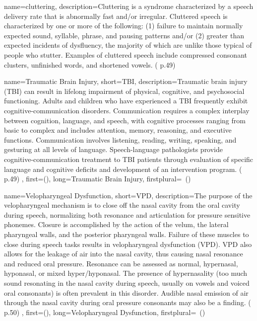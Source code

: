  {
	name={cluttering}, 
	description={Cluttering is a syndrome characterized by a speech delivery rate that is abnormally fast and/or irregular. Cluttered speech is characterized by one or more of the following: (1) failure to maintain normally expected sound, syllable, phrase, and pausing patterns and/or (2) greater than expected incidents of dysfluency, the majority of which are unlike those typical of people who stutter. Examples of cluttered speech include compressed consonant clusters, unfinished words, and shortened vowels. (\cite{SLPathologies} p.49)
}
}

 {
	name={Traumatic Brain Injury}, 
	short={TBI},
	description={Traumatic brain injury (TBI) can result in lifelong impairment of physical, cognitive, and psychosocial functioning. Adults and children who have experienced a TBI frequently exhibit cognitive-communication disorders. Communication requires a complex interplay between cognition, language, and speech, with cognitive processes ranging from basic to complex and includes attention, memory, reasoning, and executive functions. Communication involves listening, reading, writing, speaking, and gesturing at all levels of language. Speech-language pathologists provide cognitive-communication treatment to TBI patients through evaluation of specific language and cognitive deficits and development of an intervention program. (\cite{SLPathologies} p.49)
},
first={}(),
	long={Traumatic Brain Injury},
	firstplural={\glspluralsuffix\ (\glspluralsuffix )}
}


 {
	name={Velopharyngeal Dysfunction}, 
	short={VPD},
	description={The purpose of the velopharyngeal mechanism is to close off the nasal cavity from the oral cavity during speech, normalizing both resonance and articulation for pressure sensitive phonemes. Closure is accomplished by the action of the velum, the lateral pharyngeal walls, and the posterior pharyngeal walls. Failure of these muscles to close during speech tasks results in velopharyngeal dysfunction (VPD). VPD also allows for the leakage of air into the nasal cavity, thus causing nasal resonance and reduced oral pressure. Resonance can be assessed as normal, hypernasal, hyponasal, or mixed hyper/hyponasal. The presence of hypernasality (too much sound resonating in the nasal cavity during speech, usually on vowels and voiced oral consonants) is often prevalent in this disorder. Audible nasal emission of air through the nasal cavity during oral pressure consonants may also be a finding. (\cite{SLPathologies} p.50)
},
first={}(),
	long={Velopharyngeal Dysfunction},
	firstplural={\glspluralsuffix\ (\glspluralsuffix )}
}